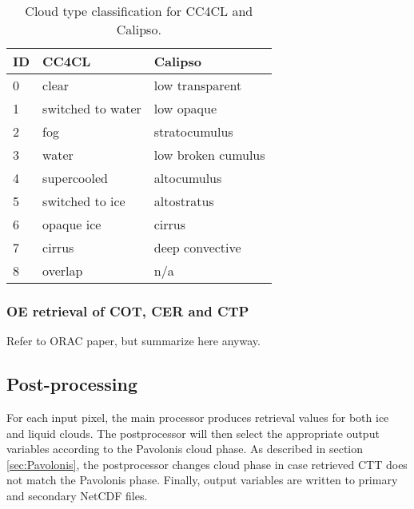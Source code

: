 \begin{table}[h]
  \caption{Cloud type classification for CC4CL and Calipso.}
  \begin{tabular}{l|ll}
    \hline
    ID & CC4CL & Calipso \\
    \hline
    0 & clear & low transparent \\
    1 & switched to water & low opaque \\
    2 & fog & stratocumulus \\
    3 & water & low broken cumulus \\
    4 & supercooled & altocumulus \\
    5 & switched to ice & altostratus \\
    6 & opaque ice & cirrus \\
    7 & cirrus & deep convective \\
    8 & overlap & n/a \\
    \hline
  \end{tabular}
  \label{tab:cloud_types}
\end{table}

\subsubsection{OE retrieval of COT, CER and CTP}
Refer to ORAC paper, but summarize here anyway.

\subsection{Post-processing}
For each input pixel, the main processor produces retrieval values for both ice and liquid clouds. The postprocessor will then select the appropriate output variables according to the Pavolonis cloud phase. As described in section \ref{sec:Pavolonis}, the postprocessor changes cloud phase in case retrieved CTT does not match the Pavolonis phase. Finally, output variables are written to primary and secondary NetCDF files.

